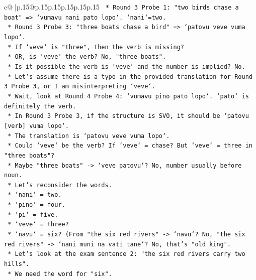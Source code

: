 \documentclass{article}
\begin{document}
{\begin{supertabular}{c@{$\;$}|p{.15\linewidth}@{}p{.15\linewidth}p{.15\linewidth}p{.15\linewidth}p{.15\linewidth}p{.15\linewidth}}
{{{\texttt{                    *   Round 3 Probe 1: "two birds chase a boat" => `vumavu nani pato lopo`. `nani`=two.} \\
\texttt{                    *   Round 3 Probe 3: "three boats chase a bird" => `patovu veve vuma lopo`.} \\
\texttt{                        *   If `veve` is "three", then the verb is missing?} \\
\texttt{                        *   OR, is `veve` the verb? No, "three boats".} \\
\texttt{                        *   Is it possible the verb is `veve` and the number is implied? No.} \\
\texttt{                        *   Let's assume there is a typo in the provided translation for Round 3 Probe 3, or I am misinterpreting `veve`.} \\
\texttt{                        *   Wait, look at Round 4 Probe 4: `vumavu pino pato lopo`. `pato` is definitely the verb.} \\
\texttt{                        *   In Round 3 Probe 3, if the structure is SVO, it should be `patovu {[}verb{]} vuma lopo`.} \\
\texttt{                        *   The translation is `patovu veve vuma lopo`.} \\
\texttt{                        *   Could `veve` be the verb? If `veve` = chase? But `veve` = three in "three boats"?} \\
\texttt{                        *   Maybe "three boats" {-}> `veve patovu`? No, number usually before noun.} \\
\texttt{                        *   Let's reconsider the words.} \\
\texttt{                        *   `nani` = two.} \\
\texttt{                        *   `pino` = four.} \\
\texttt{                        *   `pi` = five.} \\
\texttt{                        *   `veve` = three?} \\
\texttt{                        *   `navu` = six? (From "the six red rivers" {-}> `navu`? No, "the six red rivers" {-}> `nani muni na vati tane`? No, that's "old king".} \\
\texttt{                        *   Let's look at the exam sentence 2: "the six red rivers carry two hills".} \\
\texttt{                        *   We need the word for "six".} \\
}}}
\end{supertabular}}
\end{document}
